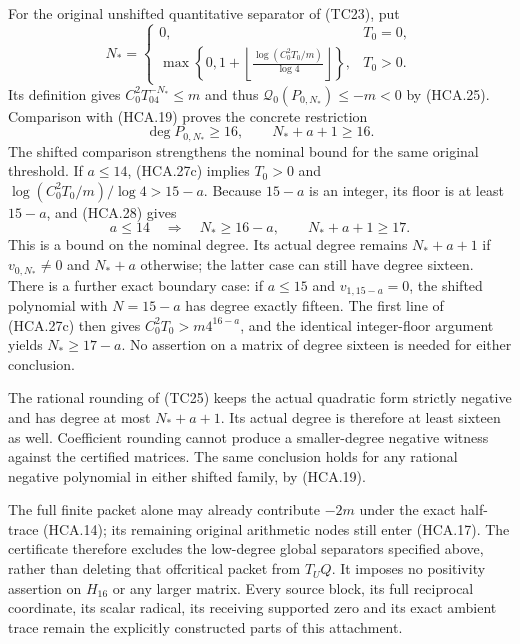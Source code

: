 For the original unshifted quantitative separator of (TC23), put
\[
 N_*=
 \begin{cases}0,&T_0=0,\\
 \displaystyle\max\!\left\{0,1+
  \left\lfloor\frac{\log(C_0^2T_0/m)}{\log4}\right\rfloor\right\},
       &T_0>0.
 \end{cases}
 \tag{HCA.28}
\]
Its definition gives $C_0^2T_04^{-N_*}\leq m$ and thus
$\mathcal Q_0(P_{0,N_*})\leq-m<0$ by (HCA.25). Comparison
with (HCA.19) proves the concrete restriction
\[
 \boxed{\deg P_{0,N_*}\geq16,\qquad N_*+a+1\geq16.}
 \tag{HCA.29}
\]
The shifted comparison strengthens the nominal bound for the same
original threshold. If $a\leq14$, (HCA.27c) implies $T_0>0$ and
$\log(C_0^2T_0/m)/\log4>15-a$. Because $15-a$ is an integer,
its floor is at least $15-a$, and (HCA.28) gives
\[
 \boxed{a\leq14\quad\Longrightarrow\quad
        N_*\geq16-a,\qquad N_*+a+1\geq17.}
 \tag{HCA.29a}
\]
This is a bound on the nominal degree. Its actual degree remains
$N_*+a+1$ if $v_{0,N_*}\ne0$ and $N_*+a$ otherwise; the latter
case can still have degree sixteen. There is a further exact boundary
case: if $a\leq15$ and $v_{1,15-a}=0$, the shifted polynomial with
$N=15-a$ has degree exactly fifteen. The first line of (HCA.27c)
then gives $C_0^2T_0>m4^{16-a}$, and the identical integer-floor
argument yields $N_*\geq17-a$. No assertion on a matrix of degree
sixteen is needed for either conclusion.

The rational rounding of (TC25) keeps the actual quadratic form
strictly negative and has degree at most $N_*+a+1$. Its actual
degree is therefore at least sixteen as well. Coefficient rounding
cannot produce a smaller-degree negative witness against the
certified matrices. The same conclusion holds for any rational
negative polynomial in either shifted family, by (HCA.19).

The full finite packet alone may already contribute $-2m$ under
the exact half-trace (HCA.14); its remaining original arithmetic
nodes still enter (HCA.17). The certificate therefore excludes
the low-degree global separators specified above, rather than
deleting that offcritical packet from $T_UQ$. It imposes no
positivity assertion on $H_{16}$ or any larger matrix. Every
source block, its full reciprocal coordinate, its scalar radical,
its receiving supported zero and its exact ambient trace remain
the explicitly constructed parts of this attachment.
